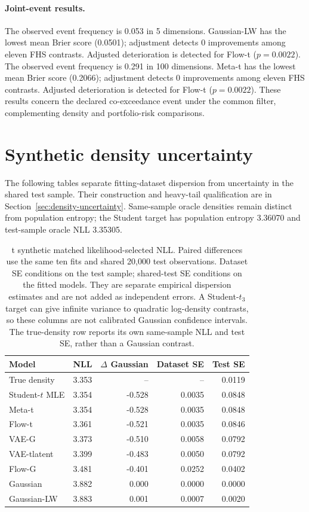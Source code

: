 \documentclass[11pt]{article}
\theoremstyle{definition}\newtheorem{definition}[theorem]{Definition}
\theoremstyle{remark}\newtheorem{remark}[theorem]{Remark}
\begin{document}
\paragraph{Joint-event results.}
The observed event frequency is 0.053 in 5 dimensions. Gaussian-LW has the lowest mean Brier score (0.0501); adjustment detects 0 improvements among eleven FHS contrasts. Adjusted deterioration is detected for Flow-t ($p=0.0022$). The observed event frequency is 0.291 in 100 dimensions. Meta-t has the lowest mean Brier score (0.2066); adjustment detects 0 improvements among eleven FHS contrasts. Adjusted deterioration is detected for Flow-t ($p=0.0022$). These results concern the declared co-exceedance event under the common filter, complementing density and portfolio-risk comparisons.

\FloatBarrier
\section{Synthetic density uncertainty}
The following tables separate fitting-dataset dispersion from uncertainty in the shared test sample. Their construction and heavy-tail qualification are in Section~\ref{sec:density-uncertainty}. Same-sample oracle densities remain distinct from population entropy; the Student target has population entropy 3.36070 and test-sample oracle NLL 3.35305.
\begin{table}[htbp]
\centering\footnotesize
\setlength{\tabcolsep}{4pt}
\begin{tabular}{lrrrr}
\toprule
Model & NLL & $\Delta$ Gaussian & Dataset SE & Test SE \\
\midrule
True density & 3.353 & -- & -- & 0.0119 \\
Student-$t$ MLE & 3.354 & -0.528 & 0.0035 & 0.0848 \\
Meta-t & 3.354 & -0.528 & 0.0035 & 0.0848 \\
Flow-t & 3.361 & -0.521 & 0.0035 & 0.0846 \\
VAE-G & 3.373 & -0.510 & 0.0058 & 0.0792 \\
VAE-tlatent & 3.399 & -0.483 & 0.0050 & 0.0792 \\
Flow-G & 3.481 & -0.401 & 0.0252 & 0.0402 \\
Gaussian & 3.882 & 0.000 & 0.0000 & 0.0000 \\
Gaussian-LW & 3.883 & 0.001 & 0.0007 & 0.0020 \\
\bottomrule
\end{tabular}
\caption{t synthetic matched likelihood-selected NLL. Paired differences use the same ten fits and shared 20,000 test observations. Dataset SE conditions on the test sample; shared-test SE conditions on the fitted models. They are separate empirical dispersion estimates and are not added as independent errors. A Student-$t_3$ target can give infinite variance to quadratic log-density contrasts, so these columns are not calibrated Gaussian confidence intervals. The true-density row reports its own same-sample NLL and test SE, rather than a Gaussian contrast.}\label{tab:r4-density-t}
\end{table}
\end{document}
